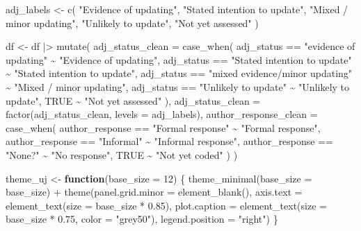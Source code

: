 \documentclass[
  11pt,
  letterpaper,
]{article}
\newenvironment{Shaded}{\begin{snugshade}}{\end{snugshade}}
\newcommand{\AttributeTok}[1]{\textcolor[rgb]{0.40,0.45,0.13}{#1}}
\newcommand{\ConstantTok}[1]{\textcolor[rgb]{0.56,0.35,0.01}{#1}}
\newcommand{\ControlFlowTok}[1]{\textcolor[rgb]{0.00,0.23,0.31}{\textbf{#1}}}
\newcommand{\DecValTok}[1]{\textcolor[rgb]{0.68,0.00,0.00}{#1}}
\newcommand{\FloatTok}[1]{\textcolor[rgb]{0.68,0.00,0.00}{#1}}
\newcommand{\FunctionTok}[1]{\textcolor[rgb]{0.28,0.35,0.67}{#1}}
\newcommand{\NormalTok}[1]{\textcolor[rgb]{0.00,0.23,0.31}{#1}}
\newcommand{\OtherTok}[1]{\textcolor[rgb]{0.00,0.23,0.31}{#1}}
\newcommand{\SpecialCharTok}[1]{\textcolor[rgb]{0.37,0.37,0.37}{#1}}
\newcommand{\StringTok}[1]{\textcolor[rgb]{0.13,0.47,0.30}{#1}}
\begin{document}
\begin{Shaded}
\begin{Highlighting}[]
\NormalTok{adj\_labels }\OtherTok{\textless{}{-}} \FunctionTok{c}\NormalTok{(}
  \StringTok{"Evidence of updating"}\NormalTok{, }\StringTok{"Stated intention to update"}\NormalTok{,}
  \StringTok{"Mixed / minor updating"}\NormalTok{, }\StringTok{"Unlikely to update"}\NormalTok{, }\StringTok{"Not yet assessed"}
\NormalTok{)}

\NormalTok{df }\OtherTok{\textless{}{-}}\NormalTok{ df }\SpecialCharTok{|\textgreater{}}
  \FunctionTok{mutate}\NormalTok{(}
    \AttributeTok{adj\_status\_clean =} \FunctionTok{case\_when}\NormalTok{(}
\NormalTok{      adj\_status }\SpecialCharTok{==} \StringTok{"evidence of updating"}          \SpecialCharTok{\textasciitilde{}} \StringTok{"Evidence of updating"}\NormalTok{,}
\NormalTok{      adj\_status }\SpecialCharTok{==} \StringTok{"Stated intention to update"}    \SpecialCharTok{\textasciitilde{}} \StringTok{"Stated intention to update"}\NormalTok{,}
\NormalTok{      adj\_status }\SpecialCharTok{==} \StringTok{"mixed evidence/minor updating"} \SpecialCharTok{\textasciitilde{}} \StringTok{"Mixed / minor updating"}\NormalTok{,}
\NormalTok{      adj\_status }\SpecialCharTok{==} \StringTok{"Unlikely to update"}            \SpecialCharTok{\textasciitilde{}} \StringTok{"Unlikely to update"}\NormalTok{,}
      \ConstantTok{TRUE}                                          \SpecialCharTok{\textasciitilde{}} \StringTok{"Not yet assessed"}
\NormalTok{    ),}
    \AttributeTok{adj\_status\_clean =} \FunctionTok{factor}\NormalTok{(adj\_status\_clean, }\AttributeTok{levels =}\NormalTok{ adj\_labels),}
    \AttributeTok{author\_response\_clean =} \FunctionTok{case\_when}\NormalTok{(}
\NormalTok{      author\_response }\SpecialCharTok{==} \StringTok{"Formal response"} \SpecialCharTok{\textasciitilde{}} \StringTok{"Formal response"}\NormalTok{,}
\NormalTok{      author\_response }\SpecialCharTok{==} \StringTok{"Informal"}        \SpecialCharTok{\textasciitilde{}} \StringTok{"Informal response"}\NormalTok{,}
\NormalTok{      author\_response }\SpecialCharTok{==} \StringTok{"None?"}           \SpecialCharTok{\textasciitilde{}} \StringTok{"No response"}\NormalTok{,}
      \ConstantTok{TRUE}                                 \SpecialCharTok{\textasciitilde{}} \StringTok{"Not yet coded"}
\NormalTok{    )}
\NormalTok{  )}

\NormalTok{theme\_uj }\OtherTok{\textless{}{-}} \ControlFlowTok{function}\NormalTok{(}\AttributeTok{base\_size =} \DecValTok{12}\NormalTok{) \{}
  \FunctionTok{theme\_minimal}\NormalTok{(}\AttributeTok{base\_size =}\NormalTok{ base\_size) }\SpecialCharTok{+}
    \FunctionTok{theme}\NormalTok{(}\AttributeTok{panel.grid.minor =} \FunctionTok{element\_blank}\NormalTok{(),}
          \AttributeTok{axis.text =} \FunctionTok{element\_text}\NormalTok{(}\AttributeTok{size =}\NormalTok{ base\_size }\SpecialCharTok{*} \FloatTok{0.85}\NormalTok{),}
          \AttributeTok{plot.caption =} \FunctionTok{element\_text}\NormalTok{(}\AttributeTok{size =}\NormalTok{ base\_size }\SpecialCharTok{*} \FloatTok{0.75}\NormalTok{, }\AttributeTok{color =} \StringTok{"grey50"}\NormalTok{),}
          \AttributeTok{legend.position =} \StringTok{"right"}\NormalTok{)}
\NormalTok{\}}
\end{Highlighting}
\end{Shaded}
\end{document}
